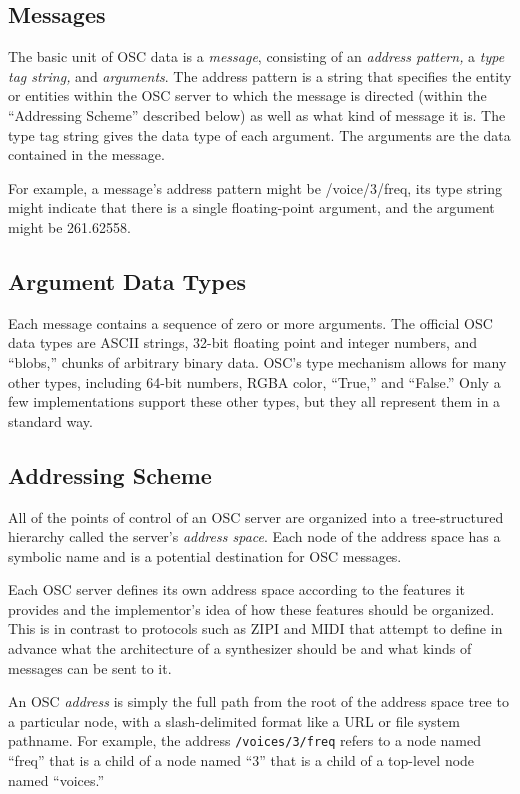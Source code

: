 \subsection{Messages}

The basic unit of OSC data is a \textit{message}, consisting of an
\textit{address pattern,} a \textit{type tag string,} and \textit{arguments}. 
The address pattern is a string that specifies the entity or entities within the
OSC server to which the message is directed (within the ``Addressing Scheme''
described below) as well as what kind of message it is. The type tag string gives
the data type of each argument.  The arguments are the data contained in the
message.

For example, a message's address pattern might be /voice/3/freq, its type string
might indicate that there is a single floating-point argument, and the argument
might be 261.62558.

\subsection{Argument Data Types}

Each message contains a sequence of zero or more arguments. The official OSC
data types are ASCII strings, 32-bit floating point and integer numbers, and
``blobs,'' chunks of arbitrary binary data. OSC's type mechanism allows for many
other types, including 64-bit numbers, RGBA color, ``True,'' and ``False.''  Only
a few implementations support these other types, but they all represent them in a
standard way.


\subsection{Addressing Scheme}

All of the points of control of an OSC server are organized into a
tree-structured hierarchy called the server's \textit{address space}. Each node
of the address space has a symbolic name and is a potential destination for OSC
messages.

Each OSC server defines its own address space according to the features it
provides and the implementor's idea of how these features should be organized. 
This is in contrast to protocols such as ZIPI \cite{McMillen:1994} and MIDI that attempt to
define in advance what the architecture of a synthesizer should be and what kinds
of messages can be sent to it.

An OSC \textit{address} is simply the full path from the root of the address
space tree to a particular node, with a slash-delimited format like a URL or file
system pathname. For example, the address \texttt{/voices/3/freq} refers to a node
named ``freq'' that is a child of a node named ``3'' that is a child of a
top-level node named ``voices.''

